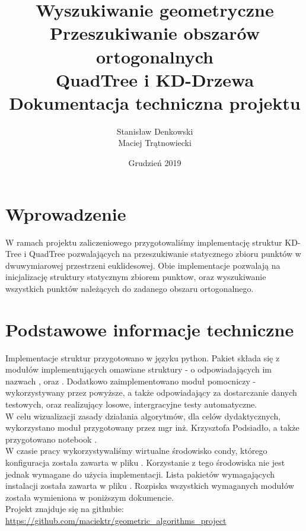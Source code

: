 \documentclass{article}
\title{Wyszukiwanie geometryczne\\
Przeszukiwanie obszarów ortogonalnych \\
QuadTree i KD-Drzewa\\
Dokumentacja techniczna projektu}
\author{Stanisław Denkowski \\ Maciej Trątnowiecki}
\date{Grudzień 2019}
\begin{document}
    \maketitle
    
    \section{Wprowadzenie}
        W ramach projektu zaliczeniowego przygotowaliśmy implementację struktur KD-Tree i QuadTree pozwalających na przeszukiwanie statycznego zbioru punktów w dwuwymiarowej przestrzeni euklidesowej. Obie implementacje pozwalają na inicjalizację struktury statycznym zbiorem punktow, oraz wyszukiwanie wszystkich punktów należących do zadanego obszaru ortogonalnego.
        
    \section{Podstawowe informacje techniczne}
        Implementacje struktur przygotowano w języku python. Pakiet składa się z modułów implementujących omawiane struktury - o odpowiadających im nazwach , oraz .
        Dodatkowo zaimplementowano moduł pomocniczy -  wykorzystywany przez powyższe, a także  odpowiadający za dostarczanie danych testowych, oraz  realizujący losowe, intergracyjne testy automatyczne. \\
        
        W celu wizualizacji zasady działania algorytmów, dla celów dydaktycznych, wykorzystano moduł  przygotowany przez mgr inż. Krzysztofa Podsiadło, a także przygotowano notebook .\\
        
        W czasie pracy wykorzystywaliśmy wirtualne środowisko condy, którego konfiguracja została zawarta w pliku . Korzystanie z tego środowiska nie jest jednak wymagane do użycia implementacji. Lista pakietów wymagających instalacji została zawarta w pliku . Rozpiska wszystkich wymaganych modułów została wymieniona w poniższym dokumencie. \\
        
        Projekt znajduje się na githubie: \url{https://github.com/maciektr/geometric_algorithms_project}
    
\end{document}
